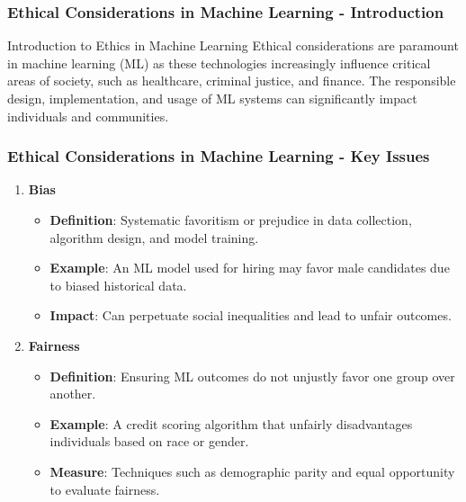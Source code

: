 \documentclass[aspectratio=169]{beamer}
\begin{document}
\begin{frame}[fragile]
    \frametitle{Ethical Considerations in Machine Learning - Introduction}
    \begin{block}{Introduction to Ethics in Machine Learning}
        Ethical considerations are paramount in machine learning (ML) as these technologies increasingly influence critical areas of society, such as healthcare, criminal justice, and finance. The responsible design, implementation, and usage of ML systems can significantly impact individuals and communities.
    \end{block}
\end{frame}

\begin{frame}[fragile]
    \frametitle{Ethical Considerations in Machine Learning - Key Issues}
    \begin{enumerate}
        \item \textbf{Bias}
            \begin{itemize}
                \item \textbf{Definition}: Systematic favoritism or prejudice in data collection, algorithm design, and model training.
                \item \textbf{Example}: An ML model used for hiring may favor male candidates due to biased historical data.
                \item \textbf{Impact}: Can perpetuate social inequalities and lead to unfair outcomes.
            \end{itemize}
            
        \item \textbf{Fairness}
            \begin{itemize}
                \item \textbf{Definition}: Ensuring ML outcomes do not unjustly favor one group over another.
                \item \textbf{Example}: A credit scoring algorithm that unfairly disadvantages individuals based on race or gender.
                \item \textbf{Measure}: Techniques such as demographic parity and equal opportunity to evaluate fairness.
            \end{itemize}
    \end{enumerate}
\end{frame}
\end{document}
